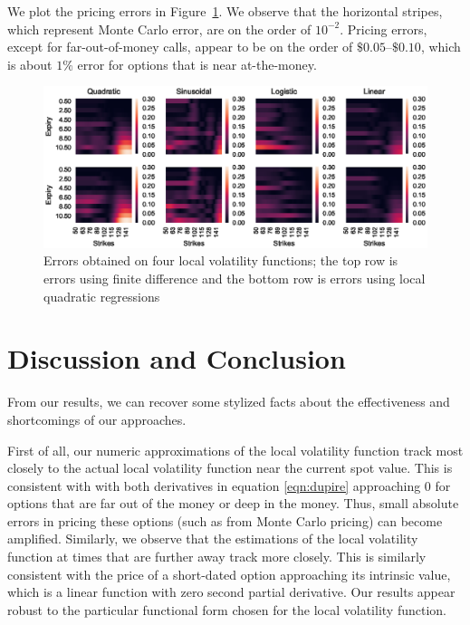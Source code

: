 \documentclass[11pt]{article}
\numberwithin{equation}{section}
\begin{document}
We plot the pricing errors in Figure~\ref{fig:errors}. We observe that the
horizontal stripes, which represent Monte Carlo error, are on the order of
$10^{-2}$. Pricing errors, except for far-out-of-money calls, appear to be on
the order of $\$0.05$--$\$0.10$, which is about $1\%$ error for options that is
near at-the-money.

\begin{figure}[h!]
  \centering
  \includegraphics{figs/errors.eps}
  \caption{Errors obtained on four local volatility functions; the top row is
     errors using finite difference and the bottom row is errors using local
     quadratic regressions}
  \label{fig:errors}
\end{figure}


\section{Discussion and Conclusion}
\label{sec:conc}

From our results, we can recover some stylized facts about the effectiveness and
shortcomings of our approaches. 

First of all, our numeric approximations of the local volatility function track
most closely to the actual local volatility function near the current spot
value. This is consistent with with both derivatives in equation
\ref{eqn:dupire} approaching 0 for options that are far out of the money or deep
in the money. Thus, small absolute errors in pricing these options (such as from
Monte Carlo pricing) can become amplified. Similarly, we observe that the
estimations of the local volatility function at times that are further away
track more closely. This is similarly consistent with the price of a short-dated
option approaching its intrinsic value, which is a linear function with zero
second partial derivative. Our results appear robust to the particular
functional form chosen for the local volatility function.
\end{document}
